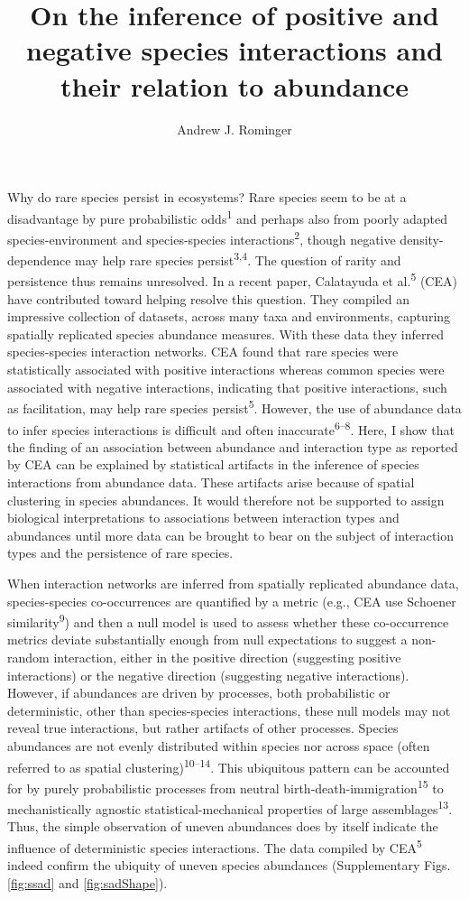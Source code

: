 \documentclass[]{article}
\title{On the inference of positive and negative species interactions and their
relation to abundance}
\author{Andrew J. Rominger}
\date{}
\begin{document}
\maketitle

Why do rare species persist in ecosystems? Rare species seem to be at a
disadvantage by pure probabilistic odds\textsuperscript{1} and perhaps
also from poorly adapted species-environment and species-species
interactions\textsuperscript{2}, though negative density-dependence may
help rare species persist\textsuperscript{3,4}. The question of rarity
and persistence thus remains unresolved. In a recent paper, Calatayuda
et al.\textsuperscript{5} (CEA) have contributed toward helping resolve
this question. They compiled an impressive collection of datasets,
across many taxa and environments, capturing spatially replicated
species abundance measures. With these data they inferred
species-species interaction networks. CEA found that rare species were
statistically associated with positive interactions whereas common
species were associated with negative interactions, indicating that
positive interactions, such as facilitation, may help rare species
persist\textsuperscript{5}. However, the use of abundance data to infer
species interactions is difficult and often
inaccurate\textsuperscript{6--8}. Here, I show that the finding of an
association between abundance and interaction type as reported by CEA
can be explained by statistical artifacts in the inference of species
interactions from abundance data. These artifacts arise because of
spatial clustering in species abundances. It would therefore not be
supported to assign biological interpretations to associations between
interaction types and abundances until more data can be brought to bear
on the subject of interaction types and the persistence of rare species.

When interaction networks are inferred from spatially replicated
abundance data, species-species co-occurrences are quantified by a
metric (e.g., CEA use Schoener similarity\textsuperscript{9}) and then a
null model is used to assess whether these co-occurrence metrics deviate
substantially enough from null expectations to suggest a non-random
interaction, either in the positive direction (suggesting positive
interactions) or the negative direction (suggesting negative
interactions). However, if abundances are driven by processes, both
probabilistic or deterministic, other than species-species interactions,
these null models may not reveal true interactions, but rather artifacts
of other processes. Species abundances are not evenly distributed within
species nor across space (often referred to as spatial
clustering)\textsuperscript{10--14}. This ubiquitous pattern can be
accounted for by purely probabilistic processes from neutral
birth-death-immigration\textsuperscript{15} to mechanistically agnostic
statistical-mechanical properties of large
assemblages\textsuperscript{13}. Thus, the simple observation of uneven
abundances does by itself indicate the influence of deterministic
species interactions. The data compiled by CEA\textsuperscript{5} indeed
confirm the ubiquity of uneven species abundances (Supplementary Figs.
\ref{fig:ssad} and \ref{fig:sadShape}).
\end{document}
